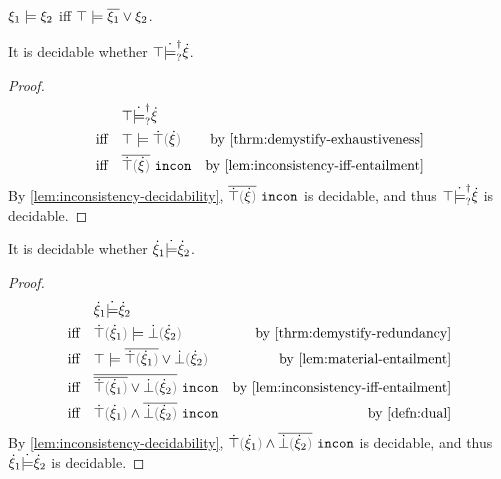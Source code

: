 \begin{lemma}
\label{lem:material-entailment}
  $\xi_1 \models \xi_2$ iff $\top \models \overline{\xi_1} \vee \xi_2$.
\end{lemma}

\begin{theorem}
\label{thrm:exhaustiveness-decidability}
It is decidable whether $\top \dot{\models}_{?}^{\dag} \dot{\xi}$.
\end{theorem}
\begin{proof}
  \begin{align*}
               & \csatisfyormay{\ctruth}{\hxi} & \\
    \text{iff} \quad& \ccsatisfy{\ctruth}{\ctruify{\hxi}} & \text{by \autoref{thrm:demystify-exhaustiveness}} \\
    \text{iff} \quad& \cincon{\cdual{\ctruify{\hxi}}} & \text{by \autoref{lem:inconsistency-iff-entailment}}
  \end{align*}
  By \autoref{lem:inconsistency-decidability}, $\cincon{\cdual{\ctruify{\hxi}}}$ is decidable, and thus $\top \dot{\models}_{?}^{\dag} \dot{\xi}$ is decidable.
\end{proof}

\begin{theorem}
\label{thrm:redundancy-decidability}
It is decidable whether $\dot{\xi}_1 \dot{\models} \dot{\xi}_2$.
\end{theorem}
\begin{proof}
  \begin{align*}
               & \csatisfy{\hxi_1}{\hxi_2} & \\
    \text{iff} \quad& \ccsatisfy{\ctruify{\hxi_1}}{\cfalsify{\hxi_2}} & \text{by \autoref{thrm:demystify-redundancy}} \\
    \text{iff} \quad& \ccsatisfy{\ctruth}{\cor{\cdual{\ctruify{\hxi_1}}}{\cfalsify{\hxi_2}}} & \text{by \autoref{lem:material-entailment}}\\
    \text{iff} \quad& \cincon{\cdual{\cor{\cdual{\ctruify{\hxi_1}}}{\cfalsify{\hxi_2}}}} & \text{by \autoref{lem:inconsistency-iff-entailment}} \\
    \text{iff} \quad& \cincon{\cand{\ctruify{\hxi_1}}{\cdual{\cfalsify{\hxi_2}}}} & \text{by \autoref{defn:dual}}
  \end{align*}
  By \autoref{lem:inconsistency-decidability}, $\cincon{\cand{\ctruify{\hxi_1}}{\cdual{\cfalsify{\hxi_2}}}}$ is decidable, and thus $\dot{\xi}_1 \dot{\models} \dot{\xi}_2$ is decidable.
\end{proof}